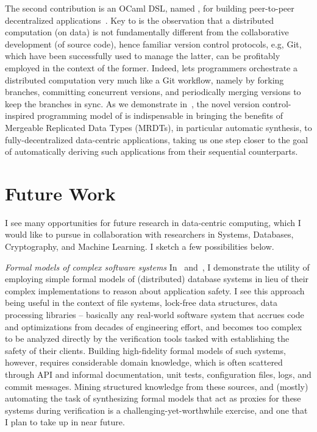 The second contribution is an OCaml DSL, named \carmot, for building
peer-to-peer decentralized applications~\cite{snapl19,oopsla19}. Key
to \carmot is the observation that a distributed computation (on data)
is not fundamentally different from the collaborative development (of
source code), hence familiar version control protocols, e.g, Git,
which have been successfully used to manage the latter, can be
profitably employed in the context of the former. Indeed, \carmot lets
programmers orchestrate a distributed computation very much like a Git
workflow, namely by forking branches, committing concurrent versions,
and periodically merging versions to keep the branches in sync. As we
demonstrate in~\cite{snapl19,oopsla19}, the novel version
control-inspired programming model of \carmot is indispensable in
bringing the benefits of Mergeable Replicated Data Types (MRDTs), in
particular automatic synthesis, to fully-decentralized data-centric
applications, taking us one step closer to the goal of automatically
deriving such applications from their sequential counterparts.

\section*{Future Work}

I see many opportunities for future research in data-centric
computing, which I would like to pursue in collaboration with
researchers in Systems, Databases, Cryptography, and Machine Learning.
I sketch a few possibilities below.

{\itshape\color{MidnightBlue}Formal models of complex software systems}
In~\cite{popl18} and~\cite{oopsla18}, I demonstrate the utility of
employing simple formal models of (distributed) database systems in
lieu of their complex implementations to reason about application
safety. I see this approach being useful in the context of file
systems, lock-free data structures, data processing libraries --
basically any real-world software system that accrues code and
optimizations from decades of engineering effort, and becomes too
complex to be analyzed directly by the verification tools tasked with
establishing the safety of their clients. Building high-fidelity
formal models of such systems, however, requires considerable domain
knowledge, which is often scattered through API and informal
documentation, unit tests, configuration files, logs, and commit
messages. Mining structured knowledge from these sources, and (mostly)
automating the task of synthesizing formal models that act as proxies
for these systems during verification is a challenging-yet-worthwhile
exercise, and one that I plan to take up in near future.

